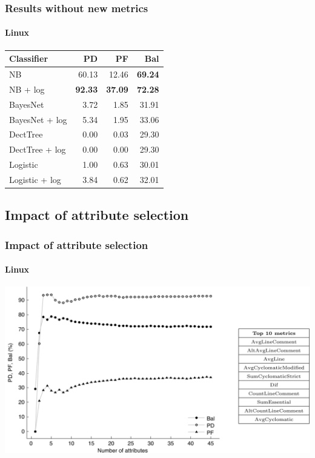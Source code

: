 \documentclass{beamer}
\begin{document}
\begin{frame}
 \frametitle{Results without new metrics}
 \framesubtitle{Linux}
 \begin{center}
 \begin{tabular}{lrrr}
  \hspace{0.2cm} Classifier & PD & PF & Bal\\
  \hline
  NB & 60.13 & 12.46 & \textbf{69.24}\\
  NB + log &  \textbf{92.33} & \textbf{37.09} & \textbf{72.28}\\
  BayesNet & 3.72 & 1.85 & 31.91\\
  BayesNet + log & 5.34 & 1.95 & 33.06\\
  DectTree & 0.00 & 0.03 & 29.30\\
  DectTree + log & 0.00 & 0.00 & 29.30\\
  Logistic & 1.00 & 0.63 & 30.01\\
  Logistic + log & 3.84 & 0.62 & 32.01\\
  \hline
 \end{tabular}
 \end{center}
\end{frame}


\subsection{Impact of attribute selection}
\begin{frame}
 \frametitle{Impact of attribute selection}
 \framesubtitle{Linux}
 \begin{center}
  \includegraphics[width=\textwidth]{figures/attributesLinux.png}
 \end{center}
\end{frame}
\end{document}
